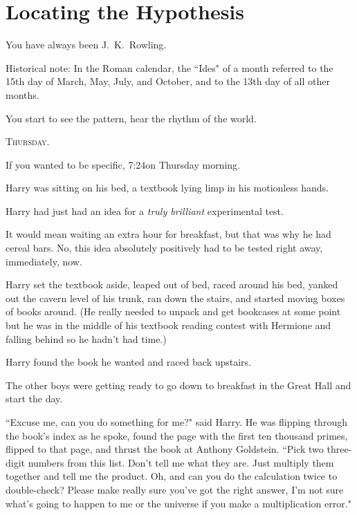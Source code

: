 \chapter{Locating the Hypothesis}

\begin{chapterOpeningAuthorNote}
You have always been J.~K.~Rowling.

Historical note: In the Roman calendar, the ``Ides" of a month referred to the 15th day of March, May, July, and October, and to the 13th day of all other months.
\end{chapterOpeningAuthorNote}
\begin{chapterOpeningQuote}
You start to see the pattern, hear the rhythm of the world.
\end{chapterOpeningQuote}

\lettrine{T}{hursday}.

\hplettrineextrapara
If you wanted to be specific, 7:24\am on Thursday morning.

Harry was sitting on his bed, a textbook lying limp in his motionless hands.

Harry had just had an idea for a \emph{truly brilliant} experimental test.

It would mean waiting an extra hour for breakfast, but that was why he had cereal bars. No, this idea absolutely positively had to be tested right away, immediately, now.

Harry set the textbook aside, leaped out of bed, raced around his bed, yanked out the cavern level of his trunk, ran down the stairs, and started moving boxes of books around. (He really needed to unpack and get bookcases at some point but he was in the middle of his textbook reading contest with Hermione and falling behind so he hadn't had time.)

Harry found the book he wanted and raced back upstairs.

The other boys were getting ready to go down to breakfast in the Great Hall and start the day.

``Excuse me, can you do something for me?" said Harry. He was flipping through the book's index as he spoke, found the page with the first ten thousand primes, flipped to that page, and thrust the book at Anthony Goldstein. ``Pick two three-digit numbers from this list. Don't tell me what they are. Just multiply them together and tell me the product. Oh, and can you do the calculation twice to double-check? Please make really sure you've got the right answer, I'm not sure what's going to happen to me or the universe if you make a multiplication error."

